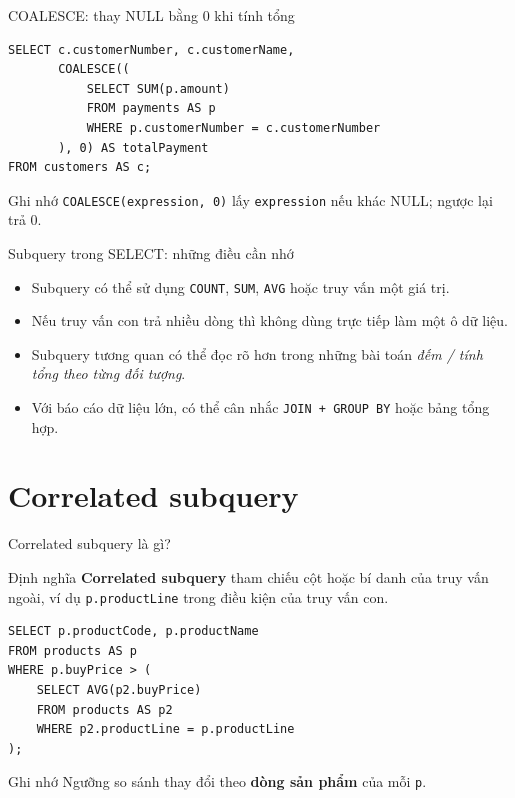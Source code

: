 \documentclass[aspectratio=169,10pt]{beamer}
\newcommand{\code}[1]{\texttt{#1}}
\begin{document}
\begin{frame}[fragile]{COALESCE: thay NULL bằng 0 khi tính tổng}
\begin{lstlisting}
SELECT c.customerNumber, c.customerName,
       COALESCE((
           SELECT SUM(p.amount)
           FROM payments AS p
           WHERE p.customerNumber = c.customerNumber
       ), 0) AS totalPayment
FROM customers AS c;
\end{lstlisting}
\begin{block}{Ghi nhớ}
\small \code{COALESCE(expression, 0)} lấy \code{expression} nếu khác NULL; ngược lại trả 0.
\end{block}
\end{frame}

\begin{frame}[fragile]{Subquery trong SELECT: những điều cần nhớ}
\begin{itemize}
\item Subquery có thể sử dụng \code{COUNT}, \code{SUM}, \code{AVG} hoặc truy vấn một giá trị.
\item Nếu truy vấn con trả nhiều dòng thì không dùng trực tiếp làm một ô dữ liệu.
\item Subquery tương quan có thể đọc rõ hơn trong những bài toán \emph{đếm / tính tổng theo từng đối tượng}.
\item Với báo cáo dữ liệu lớn, có thể cân nhắc \code{JOIN + GROUP BY} hoặc bảng tổng hợp.
\end{itemize}
\end{frame}

\section{Correlated subquery}

\begin{frame}[fragile]{Correlated subquery là gì?}
\begin{block}{Định nghĩa}
\textbf{Correlated subquery} tham chiếu cột hoặc bí danh của truy vấn ngoài, ví dụ \code{p.productLine} trong điều kiện của truy vấn con.
\end{block}
\begin{lstlisting}
SELECT p.productCode, p.productName
FROM products AS p
WHERE p.buyPrice > (
    SELECT AVG(p2.buyPrice)
    FROM products AS p2
    WHERE p2.productLine = p.productLine
);
\end{lstlisting}
\begin{block}{Ghi nhớ}
\small Ngưỡng so sánh thay đổi theo \textbf{dòng sản phẩm} của mỗi \code{p}.
\end{block}
\end{frame}
\end{document}
